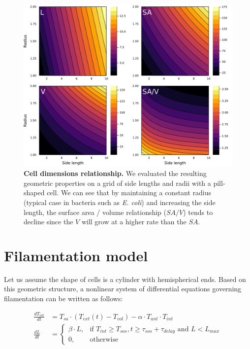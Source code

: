 \documentclass[a4paper, nobind]{templates/ociamthesis}
\begin{document}
\begin{figure}[H]
\includegraphics[width=1\linewidth]{downloadFigs4latex__main/cell-dimensions-relationship} \caption[Cell dimensions relationship.]{\textbf{Cell dimensions relationship.} We evaluated the resulting geometric properties on a grid of side lengths and radii with a pill-shaped cell. We can see that by maintaining a constant radius (typical case in bacteria such as \emph{E. coli}) and increasing the side length, the surface area / volume relationship (\(SA/V\)) tends to decline since the \(V\) will grow at a higher rate than the \(SA\).}\label{fig:cell-dimensions-relationship}
\end{figure}

\hypertarget{filamentation-model}{%
\section{Filamentation model}\label{filamentation-model}}

Let us assume the shape of cells is a cylinder with hemispherical ends.
Based on this geometric structure, a nonlinear system of differential equations governing filamentation can be written as follows:

\begin{equation}
\begin{split}
\frac{dT_{int}}{dt} &= T_{sa} \cdot (T_{ext}(t) - T_{vol}) - \alpha \cdot T_{ant} \cdot T_{int} \\
\frac{dL}{dt} &= 
  \begin{cases} 
    \beta \cdot L,& \text{if } T_{int} \geq T_{sos},  t \geq \tau_{sos} + \tau_{delay} \text{ and } L < L_{max}  \\
    0,            & \text{otherwise}
  \end{cases}
\end{split}
\label{eq:model-equation}
\end{equation}
\end{document}
